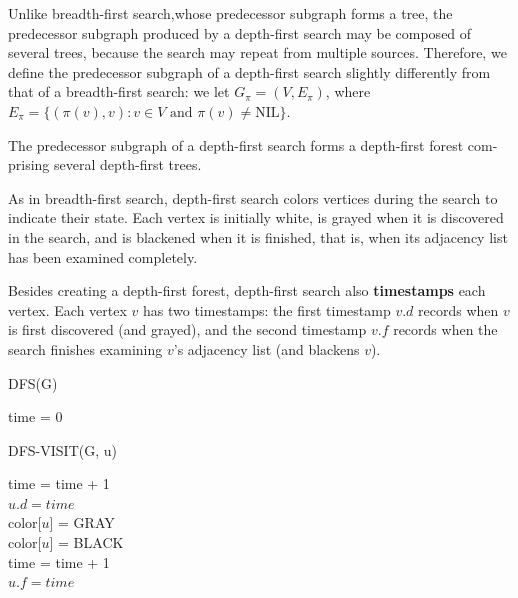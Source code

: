 Unlike breadth-first search,whose predecessor subgraph forms a tree, the predecessor subgraph produced by
a depth-first search may be composed of several trees, because the search may
repeat from multiple sources. Therefore, we define the predecessor subgraph of
a depth-first search slightly differently from that of a breadth-first search:
we let $G_{\pi} = (V, E_{\pi})$, where $E_{\pi} = \{(\pi(v), v) : v \in V \text{ and } \pi(v) \neq \text{NIL}\}$.

The predecessor subgraph of a depth-first search forms a depth-first forest com-
prising several depth-first trees.

As in breadth-first search, depth-first search colors vertices during the search to
indicate their state. Each vertex is initially white, is grayed when it is discovered
in the search, and is blackened when it is finished, that is, when its adjacency list
has been examined completely.

Besides creating a depth-first forest, depth-first search also \textbf{timestamps} each vertex. 
Each vertex $v$ has two timestamps: the first timestamp $v.d$ records when $v$
is first discovered (and grayed), and the second timestamp $v.f$ records when the
search finishes examining $v$’s adjacency list (and blackens $v$). 

\newpage 
\begin{algorithm}
    \caption{DFS(G)}
    time = 0 \\
\end{algorithm}
\begin{algorithm}
    \caption{DFS-VISIT(G, u)}
    time = time + 1 \\
    $u.d = time$ \\
    color[$u$] = GRAY \\
    color[$u$] = BLACK \\
    time = time + 1 \\
    $u.f = time$
\end{algorithm}

